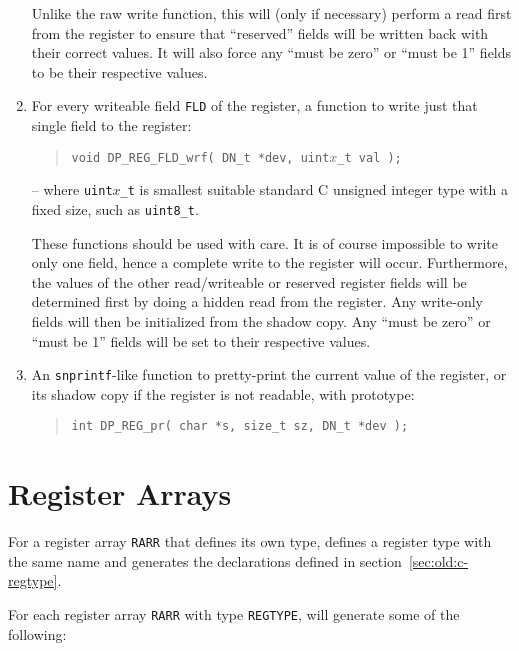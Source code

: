 \documentclass[a4paper,11pt,twoside]{report}
\begin{document}
\begin{enumerate}
  Unlike the raw write function, this will (only if necessary) perform
  a read first from the register to ensure that ``reserved'' fields
  will be written back with their correct values.  It will also force
  any ``must be zero'' or ``must be 1'' fields to be their respective 
  values.  

\item For every writeable field \texttt{FLD} of the register, a function to
  write just that single field to the register:
  \begin{quote}
    \texttt{void DP\_REG\_FLD\_wrf( DN\_t *dev, \texttt{uint$x$\_t} val );}
  \end{quote}
  -- where \texttt{uint$x$\_t} is smallest suitable standard C
  unsigned integer type with a fixed size, such as
  \texttt{uint8\_t}. 
  
  These functions should be used with care.  It is of
  course impossible to write only one field, hence a complete write to
  the register will occur.  Furthermore, the values of the other
  read/writeable or reserved register fields will be determined first
  by doing a hidden read from the register.   Any write-only 
  fields will then be initialized from the shadow copy.  Any ``must be
  zero'' or ``must be 1'' fields will be set to their respective values.  
  
\item An \texttt{snprintf}-like function to pretty-print the
  current value of the register, or its shadow copy if the register is
  not readable, with prototype:
  \begin{quote}
    \texttt{int DP\_REG\_pr( char *s, size\_t sz, DN\_t *dev );}
  \end{quote}

\end{enumerate}

\section{Register Arrays}\label{sec:old:c-regarray}

For a register array \texttt{RARR} that defines its own type, \Mac defines
a register type with the same name and generates the declarations
defined in section~\ref{sec:old:c-regtype}. 

For each register array \texttt{RARR} with type \texttt{REGTYPE}, \Mac will
generate some of the following:
\end{document}
